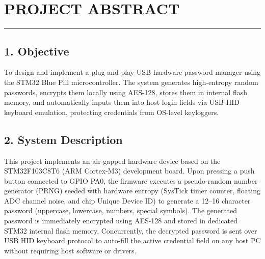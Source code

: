 \documentclass[12pt,a4paper]{article}
\begin{document}

\newpage


\pagestyle{fancy}
\setcounter{page}{1}

\vspace*{-0.3cm}

\section*{\centering PROJECT ABSTRACT}
\rule{\textwidth}{0.8pt}

\vspace{0.3cm}

\subsection*{1. Objective}
To design and implement a plug-and-play USB hardware password manager using the STM32 Blue Pill microcontroller. The system generates high-entropy random passwords, encrypts them locally using AES-128, stores them in internal flash memory, and automatically inputs them into host login fields via USB HID keyboard emulation, protecting credentials from OS-level keyloggers.

\vspace{0.3cm}

\subsection*{2. System Description}
This project implements an air-gapped hardware device based on the STM32F103C8T6 (ARM Cortex-M3) development board. Upon pressing a push button connected to GPIO PA0, the firmware executes a pseudo-random number generator (PRNG) seeded with hardware entropy (SysTick timer counter, floating ADC channel noise, and chip Unique Device ID) to generate a 12--16 character password (uppercase, lowercase, numbers, special symbols). The generated password is immediately encrypted using AES-128 and stored in dedicated STM32 internal flash memory. Concurrently, the decrypted password is sent over USB HID keyboard protocol to auto-fill the active credential field on any host PC without requiring host software or drivers.

\vspace{0.3cm}
\end{document}
